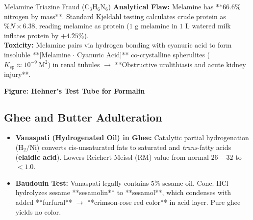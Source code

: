 \documentclass[10pt,a4paper,oneside]{article}
\begin{document}
\begin{minipage}[c]{0.52\textwidth}
\begin{mechanismbox}{Melamine Triazine Fraud ($\mathrm{C_3H_6N_6}$)}
\textbf{Analytical Flaw:} Melamine has **$66.6\%$ nitrogen by mass**. Standard Kjeldahl testing calculates crude protein as $\% N \times 6.38$, reading melamine as protein ($1\text{ g}$ melamine in $1\text{ L}$ watered milk inflates protein by $+4.25\%$).\\
\textbf{Toxicity:} Melamine pairs via hydrogen bonding with cyanuric acid to form insoluble **[Melamine $\cdot$ Cyanuric Acid]** co-crystalline spherulites ($K_{\text{sp}} \approx 10^{-9}\ \mathrm{M^2}$) in renal tubules $\rightarrow$ **Obstructive urolithiasis and acute kidney injury**.
\end{mechanismbox}
\end{minipage}
\hfill
\begin{minipage}[c]{0.45\textwidth}
\centering
{}
{\small\bfseries Figure: Hehner's Test Tube for Formalin}
\end{minipage}

\subsection{Ghee and Butter Adulteration}
\begin{itemize}[leftmargin=*]
    \item \textbf{Vanaspati (Hydrogenated Oil) in Ghee:} Catalytic partial hydrogenation ($\mathrm{H_2/Ni}$) converts cis-unsaturated fats to saturated and \textit{trans}-fatty acids (\textbf{elaidic acid}). Lowers Reichert-Meissl (RM) value from normal $26 - 32$ to $<1.0$.
    \item \textbf{Baudouin Test:} Vanaspati legally contains $5\%$ sesame oil. Conc. $\mathrm{HCl}$ hydrolyzes sesame **sesamolin** to **sesamol**, which condenses with added **furfural** $\rightarrow$ **crimson-rose red color** in acid layer. Pure ghee yields no color.
\end{itemize}
\end{document}

